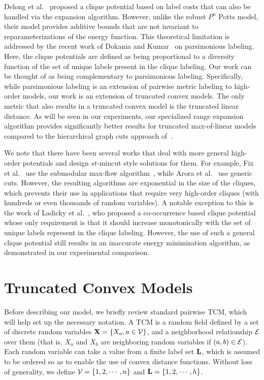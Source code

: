 \documentclass[runningheads]{llncs}
\newcommand{\mysection}[1]{\vspace{-2mm}\section{#1}\vspace{-2mm}}
\begin{document}
Delong et al.\ \cite{delongijcv12,delongcvpr10} proposed a clique potential based on label costs that can also be handled via the expansion algorithm.
However, unlike the robust $P^n$ Potts model, their model provides additive bounds that are not invariant to reparameterizations
of the energy function. This theoretical limitation is addressed by the recent work of Dokania and Kumar~\cite{dokaniaiccv15} on parsimonious
labeling. Here, the clique potentials are defined as being proportional to a diversity function of the set of unique labels present
in the clique labeling. Our work can be thought of as being complementary to parsimonious labeling. Specifically, while parsimonious labeling
is an extension of pairwise metric labeling to high-order models, our work is an extension of truncated convex models. The only
metric that also results in a truncated convex model is the truncated linear distance. As will be seen in our experiments, our
specialized range expansion algorithm provides significantly better results for truncated max-of-linear models compared to the
hierarchical graph cuts approach of~\cite{dokaniaiccv15}.

 
We note that there have been several works that deal with more general high-order potentials and design $st$-{\sc mincut} style
solutions for them. For example, Fix et al.\ \cite{fixcvpr14} use the submodular max-flow algorithm~\cite{kolmogorovdam12}, while Arora et al.\ \cite{aroracvpr14} use
generic cuts. However, the resulting algorithms are exponential in the size of the cliques, which prevents their use in applications
that require very high-order cliques (with hundreds or even thousands of random variables). A notable exception to this is the
work of Ladicky et al.\ \cite{ladickyeccv10}, who proposed a co-occurrence based clique potential whose only requirement is that it should
increase monotonically with the set of unique labels represent in the clique labeling. However, the use of such a general
clique potential still results in an inaccurate energy minimization algorithm, as demonstrated in our experimental comparison. 

\mysection{Truncated Convex Models}

Before describing our model, we briefly review standard pairwise TCM, which will help set up the
necessary notation. A TCM is a random field defined by a set of discrete random variables
${\bf X} = \{X_a, a \in {\cal V}\}$, and a neighborhood relationship ${\cal E}$ over them (that is, $X_a$ and $X_b$ are neighboring random
variables if $(a,b) \in {\cal E}$).
Each random variable can take a value from a finite label set ${\bf L}$, which
is assumed to be ordered so as to enable the use of convex distance functions. Without loss of generality, we define
${\cal V} = \{1,2,\cdots,n\}$ and ${\bf L} = \{1,2,\cdots,h\}$.
\end{document}

